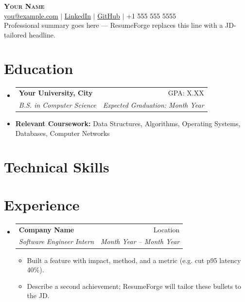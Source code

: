 \documentclass[letterpaper,10pt]{article}
\makeatletter
\newcommand{\resumeItem}[1]{
  \item{\small\setlength{\baselineskip}{10pt} #1 \vspace{-2pt}}
}
\newcommand{\resumeSubheading}[4]{
  \vspace{-2pt}\item
    \begin{tabular*}{\textwidth}[t]{@{}p{0.75\textwidth}@{\extracolsep{\fill}}r@{}}
      \textbf{#1} & \small #2 \\
      \textit{\small#3} & \textit{\small #4} \\
    \end{tabular*}\vspace{-4pt}
}
\newcommand{\resumeSubHeadingListStart}{\begin{itemize}[leftmargin=0in, label={}, topsep=0pt, partopsep=0pt]}
\newcommand{\resumeSubHeadingListEnd}{\end{itemize}}
\newcommand{\resumeItemListStart}{\begin{itemize}[leftmargin=0.15in, label={$\bullet$}, topsep=0pt, partopsep=0pt, itemsep=3pt, parsep=0pt]}
\newcommand{\resumeItemListEnd}{\end{itemize}}
\makeatother
\begin{document}
\fontsize{10.5}{11}\selectfont
\begin{center}
    {\Huge \scshape \textbf{Your Name}} \\ \vspace{4pt}
    \href{mailto:you@example.com}{\ul{you@example.com}} $|$
    \href{https://www.linkedin.com/in/your-handle/}{\ul{LinkedIn}} $|$
    \href{https://github.com/your-handle}{\ul{GitHub}} $|$
    +1 555 555 5555 \\ \vspace{6pt}
    {Professional summary goes here — ResumeForge replaces this line with a JD-tailored headline.}
\end{center}
\section{Education}
\resumeSubHeadingListStart
  \resumeSubheading
    {Your University, City}{GPA: X.XX}
    {B.S. in Computer Science}{\textit{Expected Graduation: Month Year}}  \vspace{-9pt}
  \item \small{\textbf{Relevant Coursework:} Data Structures, Algorithms, Operating Systems, Databases, Computer Networks}
\resumeSubHeadingListEnd
\section{Technical Skills}
\begin{itemize}[leftmargin=0in, label={}, topsep=0pt, partopsep=0pt]
  \small{\item{
  }}
\end{itemize}
\section{Experience}
\resumeSubHeadingListStart
  \resumeSubheading
    {Company Name}{Location}
    {Software Engineer Intern}{Month Year -- Month Year}
    \resumeItemListStart
      \resumeItem{Built a feature with impact, method, and a metric (e.g. cut p95 latency 40\%).}
      \resumeItem{Describe a second achievement; ResumeForge will tailor these bullets to the JD.}
    \resumeItemListEnd
\resumeSubHeadingListEnd
\end{document}
